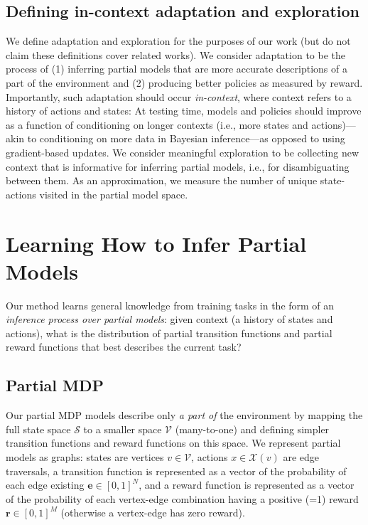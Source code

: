 \documentclass[sigconf]{aamas}
\begin{document}
\subsection{Defining in-context adaptation and exploration}
We define adaptation and exploration for the purposes of our work (but do not claim these definitions cover related works). We consider adaptation to be the process of (1) inferring partial models that are more accurate descriptions of a part of the environment and (2) producing better policies as measured by reward. Importantly, such adaptation should occur \textit{in-context}, where context refers to a history of actions and states: At testing time, models and policies should improve as a function of conditioning on longer contexts (i.e., more states and actions)---akin to conditioning on more data in Bayesian inference---as opposed to using gradient-based updates. We consider meaningful exploration to be collecting new context that is informative for inferring partial models, i.e., for disambiguating between them. As an approximation, we measure the number of unique state-actions visited in the partial model space.

\section{Learning How to Infer Partial Models}
\label{sec:learning-how-to}
Our method learns general knowledge from training tasks in the form of an \textit{inference process over partial models}: given context (a history of states and actions), what is the distribution of partial transition functions and partial reward functions that best describes the current task?

\subsection{Partial MDP}
Our partial MDP models describe only \textit{a part of} the environment by mapping the full state space $\mathscr{S}$ to a smaller space $\mathscr{V}$ (many-to-one) and defining simpler transition functions and reward functions on this space. We represent partial models as graphs: states are vertices $v \in \mathscr{V}$, actions $x \in \mathscr{X}(v)$ are edge traversals, a transition function is represented as a vector of the probability of each edge existing $\mathbf{e} \in [0,1]^N$, and a reward function is represented as a vector of the probability of each vertex-edge combination having a positive (=1) reward $\mathbf{r} \in [0,1]^M$ (otherwise a vertex-edge has zero reward).
\end{document}
